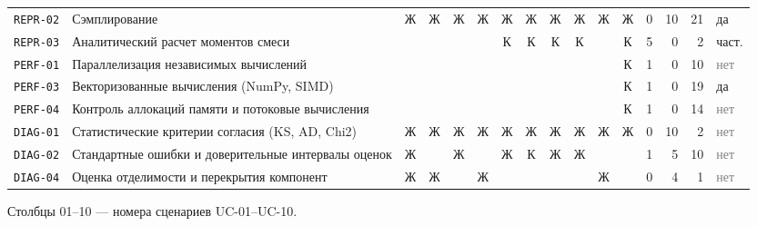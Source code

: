 \documentclass[10pt,a4paper]{article}
\begin{document}
\begin{landscape}
{\begin{longtable}{@{}l >{\raggedright\arraybackslash}p{8.2cm} *{10}{c} r r r l@{}}
\texttt{REPR-02} & Сэмплирование & \cellcolor{hm!22}Ж & \cellcolor{hm!22}Ж & \cellcolor{hm!22}Ж & \cellcolor{hm!22}Ж & \cellcolor{hm!22}Ж & \cellcolor{hm!22}Ж & \cellcolor{hm!22}Ж & \cellcolor{hm!22}Ж & \cellcolor{hm!22}Ж & \cellcolor{hm!22}Ж & 0 & 10 & 21 & \cellcolor{yes!30}да \\
\texttt{REPR-03} & Аналитический расчет моментов смеси &  &  &  &  & \cellcolor{hm!70}К & \cellcolor{hm!70}К & \cellcolor{hm!70}К & \cellcolor{hm!70}К &  & \cellcolor{hm!70}К & 5 & 0 & 2 & \cellcolor{part!40}част. \\
\texttt{PERF-01} & Параллелизация независимых вычислений &  &  &  &  &  &  &  &  &  & \cellcolor{hm!70}К & 1 & 0 & 10 & \textcolor{gray}{нет} \\
\texttt{PERF-03} & Векторизованные вычисления (NumPy, SIMD) &  &  &  &  &  &  &  &  &  & \cellcolor{hm!70}К & 1 & 0 & 19 & \cellcolor{yes!30}да \\
\texttt{PERF-04} & Контроль аллокаций памяти и потоковые вычисления &  &  &  &  &  &  &  &  &  & \cellcolor{hm!70}К & 1 & 0 & 14 & \textcolor{gray}{нет} \\
\texttt{DIAG-01} & Статистические критерии согласия (KS, AD, Chi2) & \cellcolor{hm!22}Ж & \cellcolor{hm!22}Ж & \cellcolor{hm!22}Ж & \cellcolor{hm!22}Ж & \cellcolor{hm!22}Ж & \cellcolor{hm!22}Ж & \cellcolor{hm!22}Ж & \cellcolor{hm!22}Ж & \cellcolor{hm!22}Ж & \cellcolor{hm!22}Ж & 0 & 10 & 2 & \textcolor{gray}{нет} \\
\texttt{DIAG-02} & Стандартные ошибки и доверительные интервалы оценок & \cellcolor{hm!22}Ж &  & \cellcolor{hm!22}Ж &  & \cellcolor{hm!22}Ж & \cellcolor{hm!70}К & \cellcolor{hm!22}Ж & \cellcolor{hm!22}Ж &  &  & 1 & 5 & 10 & \textcolor{gray}{нет} \\
\texttt{DIAG-04} & Оценка отделимости и перекрытия компонент & \cellcolor{hm!22}Ж & \cellcolor{hm!22}Ж &  & \cellcolor{hm!22}Ж &  &  &  &  & \cellcolor{hm!22}Ж &  & 0 & 4 & 1 & \textcolor{gray}{нет} \\
\bottomrule
\end{longtable}}
Столбцы 01--10 --- номера сценариев UC-01--UC-10.

\end{landscape}
\end{document}
